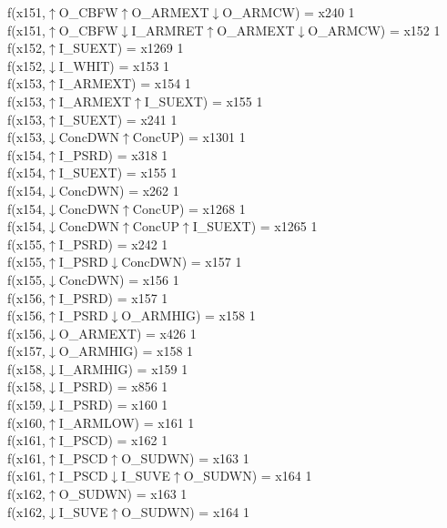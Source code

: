 f(x151,$\uparrow$O\_CBFW$\uparrow$O\_ARMEXT$\downarrow$O\_ARMCW) = x240 {1} \\
f(x151,$\uparrow$O\_CBFW$\downarrow$I\_ARMRET$\uparrow$O\_ARMEXT$\downarrow$O\_ARMCW) = x152 {1} \\
f(x152,$\uparrow$I\_SUEXT) = x1269 {1} \\
f(x152,$\downarrow$I\_WHIT) = x153 {1} \\
f(x153,$\uparrow$I\_ARMEXT) = x154 {1} \\
f(x153,$\uparrow$I\_ARMEXT$\uparrow$I\_SUEXT) = x155 {1} \\
f(x153,$\uparrow$I\_SUEXT) = x241 {1} \\
f(x153,$\downarrow$ConcDWN$\uparrow$ConcUP) = x1301 {1} \\
f(x154,$\uparrow$I\_PSRD) = x318 {1} \\
f(x154,$\uparrow$I\_SUEXT) = x155 {1} \\
f(x154,$\downarrow$ConcDWN) = x262 {1} \\
f(x154,$\downarrow$ConcDWN$\uparrow$ConcUP) = x1268 {1} \\
f(x154,$\downarrow$ConcDWN$\uparrow$ConcUP$\uparrow$I\_SUEXT) = x1265 {1} \\
f(x155,$\uparrow$I\_PSRD) = x242 {1} \\
f(x155,$\uparrow$I\_PSRD$\downarrow$ConcDWN) = x157 {1} \\
f(x155,$\downarrow$ConcDWN) = x156 {1} \\
f(x156,$\uparrow$I\_PSRD) = x157 {1} \\
f(x156,$\uparrow$I\_PSRD$\downarrow$O\_ARMHIG) = x158 {1} \\
f(x156,$\downarrow$O\_ARMEXT) = x426 {1} \\
f(x157,$\downarrow$O\_ARMHIG) = x158 {1} \\
f(x158,$\downarrow$I\_ARMHIG) = x159 {1} \\
f(x158,$\downarrow$I\_PSRD) = x856 {1} \\
f(x159,$\downarrow$I\_PSRD) = x160 {1} \\
f(x160,$\uparrow$I\_ARMLOW) = x161 {1} \\
f(x161,$\uparrow$I\_PSCD) = x162 {1} \\
f(x161,$\uparrow$I\_PSCD$\uparrow$O\_SUDWN) = x163 {1} \\
f(x161,$\uparrow$I\_PSCD$\downarrow$I\_SUVE$\uparrow$O\_SUDWN) = x164 {1} \\
f(x162,$\uparrow$O\_SUDWN) = x163 {1} \\
f(x162,$\downarrow$I\_SUVE$\uparrow$O\_SUDWN) = x164 {1} \\
